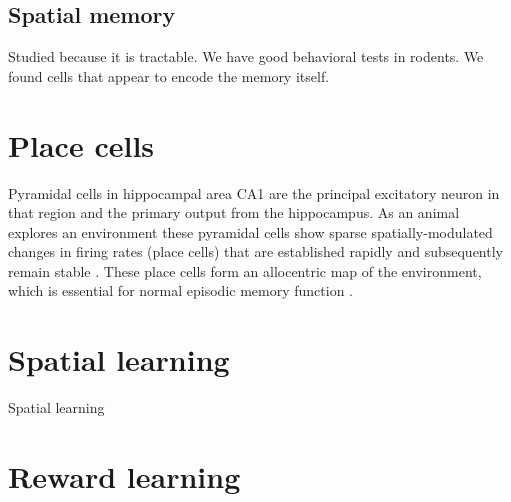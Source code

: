 \subsection{Spatial memory}\label{sec:intro:HPC:spatial}
Studied because it is tractable.
We have good behavioral tests in rodents.
We found cells that appear to encode the memory itself.

\section{Place cells}
Pyramidal cells in hippocampal area CA1 are the principal excitatory neuron in that region and the primary output from the hippocampus.
As an animal explores an environment these pyramidal cells show sparse spatially-modulated changes in firing rates (place cells) that are established rapidly and subsequently remain stable \citep{O'Keefe1971}\citep{Frank2004}.
These place cells form an allocentric map of the environment, which is essential for normal episodic memory function \citep{Smith2006c}\citep{Nakazawa2004}\citep{Buzsaki2013}.


\section{Spatial learning}
Spatial learning

\section{Reward learning}